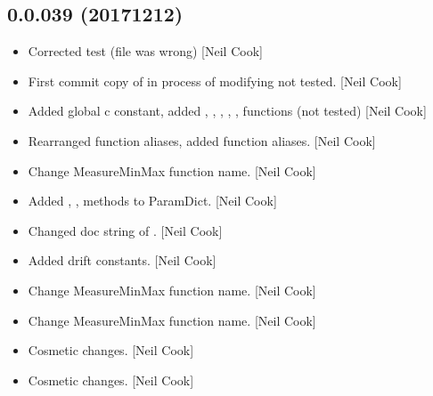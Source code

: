 \documentclass[a4paper,10pt,english]{report}
\begin{document}
\subsection{0.0.039 (2017\sphinxhyphen{}12\sphinxhyphen{}12)}
\label{\detokenize{misc/changelog:id532}}\begin{itemize}
\item {} 
Corrected  test (file was wrong) {[}Neil Cook{]}

\item {} 
First commit \sphinxhyphen{} copy of  \sphinxhyphen{} in process of modifying \sphinxhyphen{} not
tested. {[}Neil Cook{]}

\item {} 
Added global c constant, added , ,
, , , 
functions (not tested) {[}Neil Cook{]}

\item {} 
Rearranged function aliases, added  function aliases. {[}Neil
Cook{]}

\item {} 
Change MeasureMinMax function name. {[}Neil Cook{]}

\item {} 
Added , ,  methods to ParamDict.
{[}Neil Cook{]}

\item {} 
Changed doc string of . {[}Neil Cook{]}

\item {} 
Added drift constants. {[}Neil Cook{]}

\item {} 
Change MeasureMinMax function name. {[}Neil Cook{]}

\item {} 
Change MeasureMinMax function name. {[}Neil Cook{]}

\item {} 
Cosmetic changes. {[}Neil Cook{]}

\item {} 
Cosmetic changes. {[}Neil Cook{]}

\end{itemize}
\end{document}
